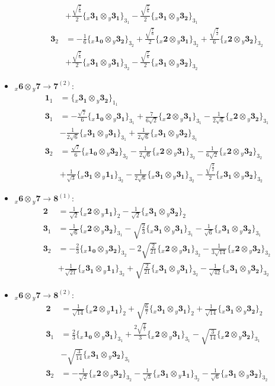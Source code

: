 \documentclass[english]{article}
\newcommand{\rep}[1]{\mathbf{#1}}
\newcommand{\repx}[2]{{}_{#2}\mathbf{#1}}
\newcommand{\subcg}[3]{\big\{ \repx{#1}{x}\otimes\repx{#2}{y}\big\}^{}_{#3}}
\begin{document}
\begin{itemize}
\begin{align*}
 & +\frac{\sqrt{\frac{7}{6}}}{2}\subcg{3_{1}}{3_{1}}{3_{1}}-\frac{\sqrt{\frac{7}{6}}}{2}\subcg{3_{1}}{3_{2}}{3_{1}}
\\
\rep{3}_{2} & = -\frac{1}{6}\subcg{1_{0}}{3_{2}}{3_{2}}+\frac{\sqrt{\frac{7}{6}}}{2}\subcg{2}{3_{1}}{3_{2}}+\frac{\sqrt{\frac{7}{2}}}{6}\subcg{2}{3_{2}}{3_{2}} \\ 
 & +\frac{\sqrt{\frac{7}{6}}}{2}\subcg{3_{1}}{3_{1}}{3_{2}}-\frac{\sqrt{\frac{7}{6}}}{2}\subcg{3_{1}}{3_{2}}{3_{2}}
\end{align*}
\item $\repx{6}{x}\otimes\repx{7}{y}\to\rep{7}^{(2)}$:
\begin{align*}
\rep{1}_{1} & = \subcg{3_{1}}{3_{2}}{1_{1}}
\\
\rep{3}_{1} & = -\frac{\sqrt{7}}{6}\subcg{1_{0}}{3_{1}}{3_{1}}+\frac{7}{6 \sqrt{2}}\subcg{2}{3_{1}}{3_{1}}-\frac{1}{2 \sqrt{6}}\subcg{2}{3_{2}}{3_{1}} \\ 
 & -\frac{1}{2 \sqrt{6}}\subcg{3_{1}}{3_{1}}{3_{1}}+\frac{1}{2 \sqrt{6}}\subcg{3_{1}}{3_{2}}{3_{1}}
\\
\rep{3}_{2} & = \frac{\sqrt{7}}{6}\subcg{1_{0}}{3_{2}}{3_{2}}-\frac{1}{2 \sqrt{6}}\subcg{2}{3_{1}}{3_{2}}-\frac{1}{6 \sqrt{2}}\subcg{2}{3_{2}}{3_{2}} \\ 
 & +\frac{1}{\sqrt{3}}\subcg{3_{1}}{1_{1}}{3_{2}}-\frac{1}{2 \sqrt{6}}\subcg{3_{1}}{3_{1}}{3_{2}}-\frac{\sqrt{\frac{3}{2}}}{2}\subcg{3_{1}}{3_{2}}{3_{2}}
\end{align*}
\item $\repx{6}{x}\otimes\repx{7}{y}\to\rep{8}^{(1)}$:
\begin{align*}
\rep{2} & = \frac{1}{\sqrt{2}}\subcg{2}{1_{1}}{2}-\frac{1}{\sqrt{2}}\subcg{3_{1}}{3_{2}}{2}
\\
\rep{3}_{1} & = \frac{1}{\sqrt{6}}\subcg{2}{3_{2}}{3_{1}}-\sqrt{\frac{2}{3}}\subcg{3_{1}}{3_{1}}{3_{1}}-\frac{1}{\sqrt{6}}\subcg{3_{1}}{3_{2}}{3_{1}}
\\
\rep{3}_{2} & = -\frac{2}{3}\subcg{1_{0}}{3_{2}}{3_{2}}-2 \sqrt{\frac{2}{21}}\subcg{2}{3_{1}}{3_{2}}-\frac{1}{3 \sqrt{14}}\subcg{2}{3_{2}}{3_{2}} \\ 
 & +\frac{1}{\sqrt{21}}\subcg{3_{1}}{1_{1}}{3_{2}}+\sqrt{\frac{2}{21}}\subcg{3_{1}}{3_{1}}{3_{2}}-\frac{1}{\sqrt{42}}\subcg{3_{1}}{3_{2}}{3_{2}}
\end{align*}
\item $\repx{6}{x}\otimes\repx{7}{y}\to\rep{8}^{(2)}$:
\begin{align*}
\rep{2} & = \frac{1}{\sqrt{14}}\subcg{2}{1_{1}}{2}+\sqrt{\frac{6}{7}}\subcg{3_{1}}{3_{1}}{2}+\frac{1}{\sqrt{14}}\subcg{3_{1}}{3_{2}}{2}
\\
\rep{3}_{1} & = \frac{2}{3}\subcg{1_{0}}{3_{1}}{3_{1}}+\frac{2 \sqrt{\frac{2}{7}}}{3}\subcg{2}{3_{1}}{3_{1}}-\sqrt{\frac{3}{14}}\subcg{2}{3_{2}}{3_{1}} \\ 
 & -\sqrt{\frac{3}{14}}\subcg{3_{1}}{3_{2}}{3_{1}}
\\
\rep{3}_{2} & = -\frac{1}{\sqrt{2}}\subcg{2}{3_{2}}{3_{2}}-\frac{1}{\sqrt{3}}\subcg{3_{1}}{1_{1}}{3_{2}}-\frac{1}{\sqrt{6}}\subcg{3_{1}}{3_{2}}{3_{2}}
\end{align*}
\end{itemize}
\end{document}
